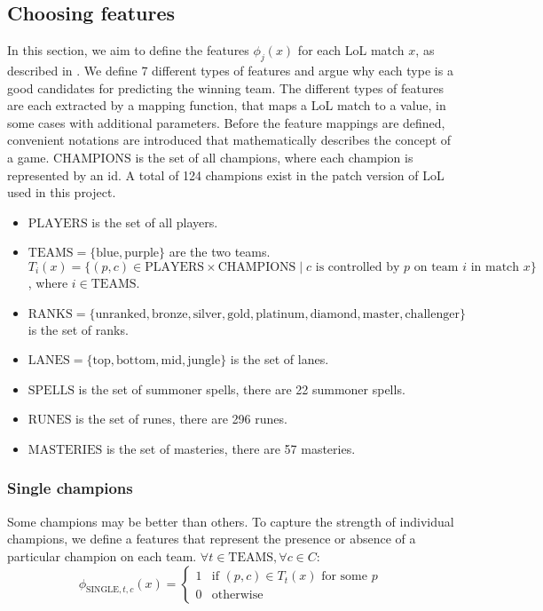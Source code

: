 \subsection{Choosing features}\label{sec:choosingfeatures}
In this section, we aim to define the features $\phi_j(x)$ for each LoL match $x$, as described in .
We define 7 different types of features and argue why each type is a good candidates for predicting the winning team.
The different types of features are each extracted by a mapping function, that maps a LoL match to a value, in some cases with additional parameters. 
Before the feature mappings are defined, convenient notations are introduced that mathematically describes the concept of a game.
$\text{CHAMPIONS}$ is the set of all champions, where each champion is represented by an id. A total of 124 champions exist in the patch version of LoL used in this project.
\begin{itemize}
\item $\text{PLAYERS}$ is the set of all players.
\item $\text{TEAMS} = \{\text{blue}, \text{purple}\}$ are the two teams.
$T_i(x) = \{ (p, c) \in \text{PLAYERS} \times \text{CHAMPIONS} \mid c \text{ is controlled by } p \text{ on team } i  \text{ in match } x \}$, where $i \in \text{TEAMS}$.
\item $\text{RANKS} = \{\text{unranked},\text{bronze},\text{silver},\text{gold},\text{platinum},\text{diamond},\text{master},\text{challenger}\}$ is the set of ranks.
\item $\text{LANES} = \{\text{top},\text{bottom},\text{mid},\text{jungle}\}$ is the set of lanes.
\item $\text{SPELLS}$ is the set of summoner spells, there are 22 summoner spells.
\item $\text{RUNES}$ is the set of runes, there are 296 runes.
\item $\text{MASTERIES}$ is the set of masteries, there are 57 masteries.
\end{itemize}

\subsubsection{Single champions}
Some champions may be better than others. To capture the strength of individual champions, we define a features that represent the presence or absence of a particular champion on each team.
$\forall t \in \text{TEAMS}, \forall c \in C:$
\begin{equation}\label{eq:single}  
\phi_{\text{SINGLE}, t, c}(x) = 
\begin{cases} 
  1 & \text{if } (p, c) \in T_t(x) \text{ for some } p \\
  0 & \text{otherwise} 
\end{cases}
\end{equation}

